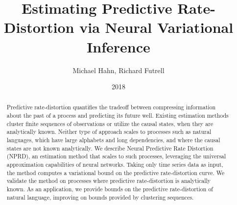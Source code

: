 \documentclass[11pt,letterpaper]{article}
\author{Michael Hahn, Richard Futrell}
\title{Estimating Predictive Rate-Distortion via Neural Variational Inference}
\date{2018}
\begin{document}
\maketitle



\begin{abstract}
Predictive rate-distortion quantifies the tradeoff between compressing information about the past of a process and predicting its future well.
Existing estimation methods cluster finite sequences of observations or utilize the causal states, when they are analytically known.
Neither type of approach scales to processes such as natural languages, which have large alphabets and long dependencies, and where the causal states are not known analytically.
	We describe Neural Predictive Rate Distortion (NPRD), an estimation method that scales to such processes, leveraging the universal approximation capabilities of neural networks.
Taking only time series data as input, the method computes a variational bound on the predictive rate-distortion curve.
We validate the method on processes where predictive rate-distortion is analytically known.
As an application, we provide bounds on the predictive rate-distortion of natural language, improving on bounds provided by clustering sequences.
\end{abstract}


%
\end{document}
